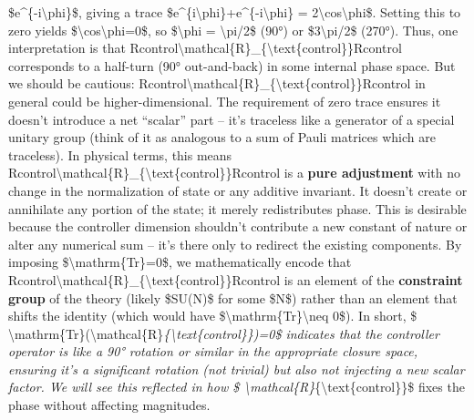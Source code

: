 \documentclass[]{article}
\begin{document}
{\$e\^{}\{-i\textbackslash{}phi\}\$, giving a trace
\$e\^{}\{i\textbackslash{}phi\}+e\^{}\{-i\textbackslash{}phi\} =
2\textbackslash{}cos\textbackslash{}phi\$. Setting this to zero yields
\$\textbackslash{}cos\textbackslash{}phi=0\$, so \$\textbackslash{}phi =
\textbackslash{}pi/2\$ (90°) or \$3\textbackslash{}pi/2\$ (270°). Thus,
one interpretation is that
Rcontrol\textbackslash{}mathcal\{R\}\_\{\textbackslash{}text\{control\}\}Rcontrol​
corresponds to a half-turn (90° out-and-back) in some internal phase
space. But we should be cautious:
Rcontrol\textbackslash{}mathcal\{R\}\_\{\textbackslash{}text\{control\}\}Rcontrol​
in general could be higher-dimensional. The requirement of zero trace
ensures it doesn't introduce a net ``scalar'' part -- it's traceless
like a generator of a special unitary group (think of it as analogous to
a sum of Pauli matrices which are traceless). In physical terms, this
means
Rcontrol\textbackslash{}mathcal\{R\}\_\{\textbackslash{}text\{control\}\}Rcontrol​
is a \textbf{pure adjustment} with no change in the normalization of
state or any additive invariant. It doesn't create or annihilate any
portion of the state; it merely redistributes phase. This is desirable
because the controller dimension shouldn't contribute a new constant of
nature or alter any numerical sum -- it's there only to redirect the
existing components. By imposing \$\textbackslash{}mathrm\{Tr\}=0\$, we
mathematically encode that
Rcontrol\textbackslash{}mathcal\{R\}\_\{\textbackslash{}text\{control\}\}Rcontrol​
is an element of the \textbf{constraint group} of the theory (likely
\$SU(N)\$ for some \$N\$) rather than an element that shifts the
identity (which would have
\$\textbackslash{}mathrm\{Tr\}\textbackslash{}neq 0\$). In short, \$
\textbackslash{}mathrm\{Tr\}(\textbackslash{}mathcal\{R\}\emph{\{\textbackslash{}text\{control\}\})=0\$
indicates that the controller operator is like a 90° rotation or similar
in the appropriate closure space, ensuring it's a significant rotation
(not trivial) but also not injecting a new scalar factor. We will see
this reflected in how \$
\textbackslash{}mathcal\{R\}}\{\textbackslash{}text\{control\}\}\$ fixes
the phase without affecting magnitudes.

}
\end{document}
